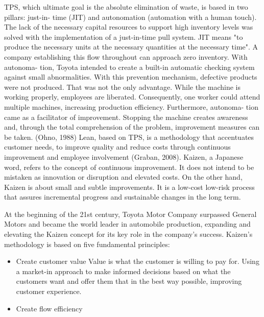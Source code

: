 \documentclass[]{article}
\begin{document}
TPS, which ultimate goal is the absolute elimination of waste, is based in two pillars: just-in-
time (JIT) and autonomation (automation with a human touch). The lack of the necessary capital
resources to support high inventory levels was solved with the implementation of a just-in-time
pull system. JIT means "to produce the necessary units at the necessary quantities at the necessary
time". A company establishing this flow throughout can approach zero inventory. With autonoma-
tion, Toyota intended to create a built-in automatic checking system against small abnormalities.
With this prevention mechanism, defective products were not produced. That was not the only
advantage. While the machine is working properly, employees are liberated. Consequently, one
worker could attend multiple machines, increasing production efficiency. Furthermore, autonoma-
tion came as a facilitator of improvement. Stopping the machine creates awareness and, through
the total comprehension of the problem, improvement measures can be taken. (Ohno, 1988)
Lean, based on TPS, is a methodology that accentuates customer needs, to improve quality
and reduce costs through continuous improvement and employee involvement (Graban, 2008).
Kaizen, a Japanese word, refers to the concept of continuous improvement. It does not intend
to be mistaken as innovation or disruption and elevated costs. On the other hand, Kaizen is about
small and subtle improvements. It is a low-cost low-risk process that assures incremental progress
and sustainable changes in the long term.

At the beginning of the 21st century, Toyota Motor Company surpassed General Motors and
became the world leader in automobile production, expanding and elevating the Kaizen concept
for its key role in the company’s success. Kaizen’s methodology is based on five
fundamental principles:
\begin{itemize}
  \item Create customer value
    \subitem Value is what the customer is willing to pay for. Using a market-in approach to make
informed decisions based on what the customers want and offer them that in the best way
possible, improving customer experience.
  
  \item Create flow efficiency
\end{itemize}

\clearpage
\newpage
\end{document}
